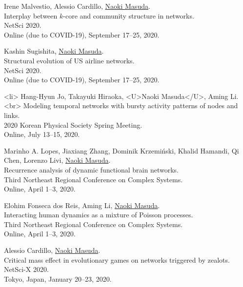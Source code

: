 \documentclass[11pt,letter]{article}
\begin{document}
\begin{etaremune}
\item Irene Malvestio, Alessio Cardillo, \underline{Naoki Masuda}.\\
Interplay between $k$-core and community structure in networks.\\
NetSci 2020.\\
Online (due to COVID-19), September 17--25, 2020.

\item Kashin Sugishita, \underline{Naoki Masuda}.\\
Structural evolution of US airline networks.\\
NetSci 2020.\\
Online (due to COVID-19), September 17--25, 2020.

\item <li> Hang-Hyun Jo, Takayuki Hiraoka, <U>Naoki Masuda</U>, Aming Li.<br>
Modeling temporal networks with bursty activity patterns of nodes and links.\\ 
2020 Korean Physical Society Spring Meeting.\\
Online, July 13--15, 2020.

\item Marinho A. Lopes, Jiaxiang Zhang, Dominik Krzemi\'{n}ski, Khalid Hamandi, Qi Chen, Lorenzo Livi, \underline{Naoki Masuda}.\\
Recurrence analysis of dynamic functional brain networks.\\
Third Northeast Regional Conference on Complex Systems.\\
Online, April 1--3, 2020.

\item Elohim Fonseca dos Reis, Aming Li, \underline{Naoki Masuda}.\\
Interacting human dynamics as a mixture of Poisson processes.\\
Third Northeast Regional Conference on Complex Systems.\\
Online, April 1--3, 2020.

\item Alessio Cardillo, \underline{Naoki Masuda}.\\
Critical mass effect in evolutionary games on networks triggered by zealots.\\
NetSci-X 2020.\\
Tokyo, Japan, January 20--23, 2020.


\end{etaremune}
\end{document}
